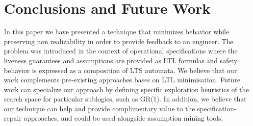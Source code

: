 \section{Conclusions and Future Work}
In this paper we have presented a technique that minimizes behavior while
preserving non realizability in order to provide feedback to an engineer.
The problem was introduced in the context of operational specifications where
the liveness guarantees and assumptions are provided as LTL formulas and safety behavior
is expressed as a composition of LTS automata.  %
We believe that our work complements pre-existing approaches bases on LTL minimisation. 
Future work can specialize
our approach by defining specific exploration heuristics of the search space for particular sublogics, such as GR(1).  
In addition, we believe that our technique can help and provide complimentary value to the
specification-repair approaches, and could be used alongside assumption mining
tools.


